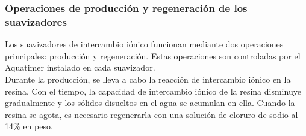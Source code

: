 
\subsubsection{Operaciones de producción y regeneración de los suavizadores}

Los suavizadores de intercambio iónico funcionan mediante dos operaciones principales: producción y regeneración. Estas operaciones son controladas por el Aquatimer instalado en cada suavizador.\\

Durante la producción, se lleva a cabo la reacción de intercambio iónico en la resina. Con el tiempo, la capacidad de intercambio iónico de la resina disminuye gradualmente y los sólidos disueltos en el agua se acumulan en ella. Cuando la resina se agota, es necesario regenerarla con una solución de cloruro de sodio al 14\% en peso.\\
